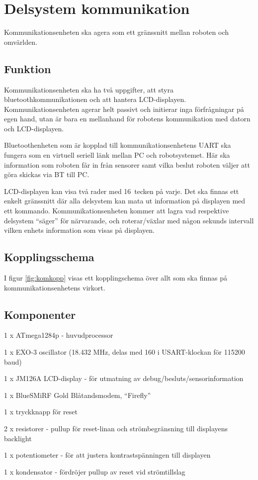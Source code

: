 \section{Delsystem kommunikation}
Kommunikationsenheten ska agera som ett gränssnitt mellan roboten och omvärlden.

\subsection{Funktion}
Kommunikationsenheten ska ha två uppgifter, att styra bluetoothkommunikationen och att hantera LCD-displayen. Kommunikationsenheten agerar helt passivt och initierar inga förfrågningar på egen hand, utan är bara en mellanhand för robotens kommunikation med datorn och \mbox{LCD-displayen.}

Bluetoothenheten som är kopplad till kommunikationsenhetens UART ska fungera som en virtuell seriell länk mellan PC och robotsystemet. Här ska information som roboten får in från sensorer samt vilka beslut roboten väljer att göra skickas via BT till PC.

LCD-displayen kan visa två rader med 16~tecken på varje. Det ska finnas ett enkelt gränssnitt där alla delsystem kan mata ut information på displayen med ett kommando. Kommunikationsenheten kommer att lagra vad respektive delsystem “säger” för närvarande, och roterar/växlar med någon sekunds intervall vilken enhets information som visas på displayen. 


\subsection{Kopplingsschema}
I figur \ref{fig:komkopp} visas ett kopplingschema över allt som ska finnas på kommunikationsenhetens virkort.


\subsection{Komponenter}
\begin{packed_itemize}
\item 1 x ATmega1284p - huvudprocessor
\item 1 x EXO-3 oscillator (18.432 MHz, delas med 160 i USART-klockan för 115200 baud)
\item 1 x JM126A LCD-display - för utmatning av debug/besluts/sensorinformation
\item 1 x BlueSMiRF Gold Blåtandsmodem, “Firefly”
\item 1 x tryckknapp för reset
\item 2 x resistorer - pullup för reset-linan och strömbegränsning till displayens backlight
\item 1 x potentiometer - för att justera kontrastspänningen till displayen
\item 1 x kondensator - fördröjer pullup av reset vid strömtillslag
\end{packed_itemize}


